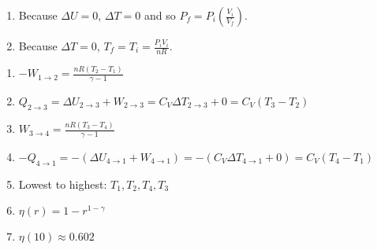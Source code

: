 \documentclass[a4paper,12pt]{article}
\begin{document}
\begin{enumerate}[label=\textbf{[\arabic*]}]
\begin{enumerate}
            \item
                Because $\Delta U = 0$, $\Delta T = 0$ and so $P_f = P_i \left( \frac{V_i}{V_f} \right)$.

            \item
                Because $\Delta T = 0$, $T_f = T_i = \frac{P_i V_i}{nR}$.
        \end{enumerate}

    \item
        \begin{enumerate}
            \item
                $-W_{1 \to 2} = \frac{nR(T_2 - T_1)}{\gamma - 1}$

            \item
                $Q_{2 \to 3} = \Delta U_{2 \to 3} + W_{2 \to 3} = C_V \Delta T_{2 \to 3} + 0 = C_V (T_3 - T_2)$

            \item
                $W_{3 \to 4} = \frac{nR(T_3 - T_4)}{\gamma - 1}$

            \item
                $-Q_{4 \to 1} = -(\Delta U_{4 \to 1} + W_{4 \to 1}) = -(C_V \Delta T_{4 \to 1} + 0) = C_V (T_4 - T_1)$

            \item
                Lowest to highest: $T_1, T_2, T_4, T_3$

            \item
                $\eta(r) = 1 - r^{1 - \gamma}$

            \item
                $\eta(10) \approx 0.602$

        \end{enumerate}


\end{enumerate}
\end{document}

